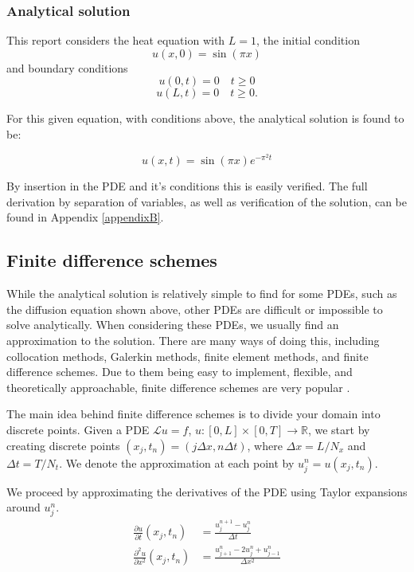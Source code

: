 \subsubsection{Analytical solution}
This report considers the heat equation with $L=1$, the initial condition
\begin{equation}
u(x, 0) = \sin(\pi x)    
\end{equation}
and boundary conditions
\begin{equation}
    u(0, t)=0 \quad t\ge0
\end{equation}
\begin{equation}
    u(L, t)=0 \quad t\ge 0.
\end{equation}

For this given equation, with conditions above, the analytical solution is found to be: 

\begin{equation}\label{analytical_sol}
    u(x,t) = \sin(\pi x) e^{-\pi^2 t}
\end{equation}

By insertion in the PDE and it's conditions this is easily verified. The full derivation by separation of variables, as well as verification of the solution, can be found in Appendix \ref{appendixB}.

\subsection{Finite difference schemes}\label{sec:FD}
While the analytical solution is relatively simple to find for some PDEs, such as the diffusion equation shown above, other PDEs are difficult or impossible to solve analytically.
When considering these PDEs, we usually find an approximation to the solution.
There are many ways of doing this, including collocation methods, Galerkin methods, finite element methods, and finite difference schemes.
Due to them being easy to implement, flexible, and theoretically approachable, finite difference schemes are very popular \citep[p. 119]{tveitoPDE}.

The main idea behind finite difference schemes is to divide your domain into discrete points.
Given a PDE $\mathcal{L}u=f$, $u : [0, L] \times [0, T] \to \mathbb{R}$, we start by creating discrete points $(x_j, t_n) = (j \Delta x, n\Delta t)$, where $\Delta x = L/N_x$ and $\Delta t = T/N_t$.
We denote the approximation at each point by $u_j^n = u(x_j, t_n)$.

We proceed by approximating the derivatives of the PDE using Taylor expansions around $u_j^n$.
\begin{align}
    \label{eq:fd_dt}
    \frac{\partial u}{\partial t}(x_j, t_n) &= \frac{u_j^{n+1}-u_j^n}{\Delta t} \\
    \label{eq:fd_dx2}
    \frac{\partial^2 u}{\partial x^2}(x_j, t_n) &= \frac{u_{j+1}^n - 2u_j^n + u_{j-1}^n}{\Delta x^2}
\end{align}

